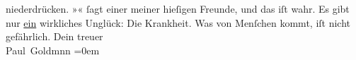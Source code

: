 \begin{ledgroupsized}[t]{13cm}
               niederdrücken. »\label{K_L02803-4v}\label{K_L02803-4h}« ſagt einer meiner hieſigen Freunde, und das iſt wahr. {\pb}Es gibt nur \uline{ein}
               wirkliches Unglück: Die Krankheit. Was von Menſchen kommt, iſt nicht gefährlich.\pend
           \pstart
           Dein treuer {\\[\baselineskip]}\spacefill\mbox{Paul Goldmnn}\pend
           \leftskip=0em{}
         
         \endnumbering{}\end{ledgroupsized}  \newcommand{\dateiname}{L02803}\newcommand{\titel}{Paul Goldmann an Arthur Schnitzler, 16. 2. [1897]}\newcommand{\editorInnen}{Martin Anton Müller und Laura Untner}
      
